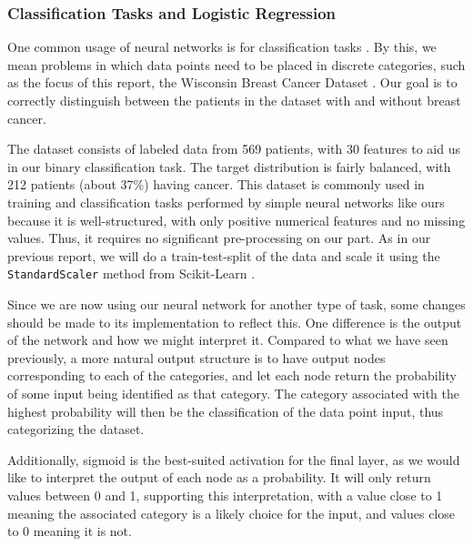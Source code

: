 

\subsubsection{Classification Tasks and Logistic Regression}
One common usage of neural networks is for classification tasks \cite{metanaClassificationTasks}. By this, we mean problems in which data points need to be placed in discrete categories, such as the focus of this report, the Wisconsin Breast Cancer Dataset \cite{sklearnBreastCancerData}. Our goal is to correctly distinguish between the patients in the dataset with and without breast cancer.  

The dataset consists of labeled data from 569 patients, with 30 features to aid us in our binary classification task. The target distribution is fairly balanced, with 212 patients (about 37\%) having cancer. This dataset is commonly used in training and classification tasks performed by simple neural networks like ours because it is well-structured, with only positive numerical features and no missing values. Thus, it requires no significant pre-processing on our part. As in our previous report, we will do a train-test-split of the data and scale it using the \texttt{StandardScaler} method from Scikit-Learn \cite{sklearnScaling}.

Since we are now using our neural network for another type of task, some changes should be made to its implementation to reflect this. One difference is the output of the network and how we might interpret it. Compared to what we have seen previously, a more natural output structure is to have output nodes corresponding to each of the categories, and let each node return the probability of some input being identified as that category. The category associated with the highest probability will then be the classification of the data point input, thus categorizing the dataset. 

Additionally, sigmoid is the best-suited activation for the final layer, as we would like to interpret the output of each node as a probability. It will only return values between 0 and 1, supporting this interpretation, with a value close to 1 meaning the associated category is a likely choice for the input, and values close to 0 meaning it is not. 

